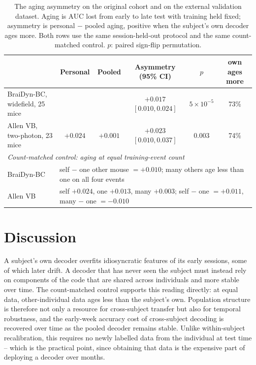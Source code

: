 \documentclass[mlabstract,onecolumn]{jmlr}
\newcommand{\auc}{\mathrm{AUC}}
\begin{document}
\begin{table}[t]\centering
\caption{The aging asymmetry on the original cohort and on the external validation dataset. Aging
is $\auc$ lost from early to late test with training held fixed; asymmetry is personal $-$ pooled
aging, positive when the subject's own decoder ages more. Both rows use the same session-held-out
protocol and the same count-matched control. $p$: paired sign-flip permutation.}
\label{tab:allen}
\setlength{\tabcolsep}{5pt}
\begin{tabular}{lccccc}
\toprule
& Personal & Pooled & Asymmetry (95\% CI) & $p$ & own ages more \\
\midrule
BraiDyn-BC, widefield, 25 mice & & & $+0.017$ $[0.010, 0.024]$ & $5\times10^{-5}$ & 73\% \\
Allen VB, two-photon, 23 mice & $+0.024$ & $+0.001$ & $+0.023$ $[0.010, 0.037]$ & 0.003 & 74\% \\
\midrule
\multicolumn{6}{l}{\emph{Count-matched control: aging at equal training-event count}} \\
BraiDyn-BC & \multicolumn{5}{l}{self $-$ one other mouse $= +0.010$; many others age less than one on all four events} \\
Allen VB & \multicolumn{5}{l}{self $+0.024$, one $+0.013$, many $+0.003$; self $-$ one $= +0.011$, many $-$ one $= -0.010$} \\
\bottomrule
\end{tabular}
\end{table}

\section{Discussion}
A subject's own decoder overfits idiosyncratic features of its early sessions, some of which later
drift. A decoder that has never seen the subject must instead rely on components of the code that are
shared across individuals and more stable over time. The count-matched control supports this reading
directly: at equal data, other-individual data ages less than the subject's own. Population structure
is therefore not only a resource for cross-subject transfer but also for temporal robustness, and the
early-week accuracy cost of cross-subject decoding is recovered over time as the pooled decoder
remains stable. Unlike within-subject recalibration, this requires no newly labelled data from the
individual at test time -- which is the practical point, since obtaining that data is the expensive
part of deploying a decoder over months.
\end{document}

